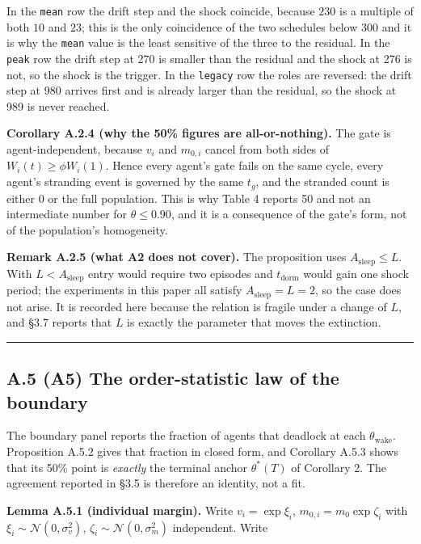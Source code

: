 \documentclass[11pt,a4paper]{article}
\begin{document}
In the \texttt{mean} row the drift step and the shock coincide, because \(230\) is a
multiple of both \(10\) and \(23\); this is the only coincidence of the two schedules
below \(300\) and it is why the \texttt{mean} value is the least sensitive of the three to
the residual. In the \texttt{peak} row the drift step at 270 is smaller than the residual
and the shock at 276 is not, so the shock is the trigger. In the \texttt{legacy} row the
roles are reversed: the drift step at 980 arrives first and is already larger than
the residual, so the shock at 989 is never reached.

\textbf{Corollary A.2.4 (why the 50\% figures are all-or-nothing).} The gate is
agent-independent, because \(v_i\) and \(m_{0,i}\) cancel from both sides of
\(W_i(t)\ge\phi W_i(1)\). Hence every agent's gate fails on the same cycle, every
agent's stranding event is governed by the same \(t_g\), and the stranded count is
either 0 or the full population. This is why Table 4 reports 50 and not an
intermediate number for \(\theta\le0.90\), and it is a consequence of the gate's
form, not of the population's homogeneity.

\textbf{Remark A.2.5 (what A2 does not cover).} The proposition uses \(A_{\mathrm{sleep}}
\le L\). With \(L<A_{\mathrm{sleep}}\) entry would require two episodes and
\(t_{\mathrm{dorm}}\) would gain one shock period; the experiments in this paper all
satisfy \(A_{\mathrm{sleep}}=L=2\), so the case does not arise. It is recorded here
because the relation is fragile under a change of \(L\), and §3.7 reports that \(L\) is
exactly the parameter that moves the extinction.

\begin{center}\rule{0.5\linewidth}{0.5pt}\end{center}

\subsection{A.5 (A5) The order-statistic law of the boundary}\label{a.5-a5-the-order-statistic-law-of-the-boundary}

The boundary panel reports the fraction of agents that deadlock at each
\(\theta_{\mathrm{wake}}\). Proposition A.5.2 gives that fraction in closed form, and
Corollary A.5.3 shows that its 50\% point is \emph{exactly} the terminal anchor
\(\theta^\ast(T)\) of Corollary 2. The agreement reported in §3.5 is therefore an
identity, not a fit.

\textbf{Lemma A.5.1 (individual margin).} Write \(v_i=\exp\xi_i\),
\(m_{0,i}=m_0\exp\zeta_i\) with \(\xi_i\sim\mathcal{N}(0,\sigma_v^2)\),
\(\zeta_i\sim\mathcal{N}(0,\sigma_m^2)\) independent. Write
\end{document}
